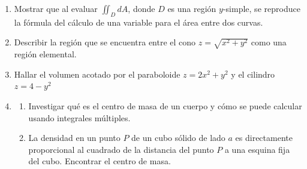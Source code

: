 \documentclass{article}
\begin{document}
\begin{enumerate}
    \item {
        Mostrar que al evaluar $\iint_DdA$, donde $D$ es una región $y$-simple, se reproduce la fórmula del cálculo de una variable para el área entre dos curvas.

        
    }

   \item {
   Describir la región que se encuentra entre el cono $z = \sqrt{x^2 + y^2}$ como una región elemental.\\

	
    }
    
   \item {
   Hallar el volumen acotado por el paraboloide $z = 2x^2 + y^2$ y el cilindro $z = 4 - y^2$\\

	
    }
    
   \item {
    \begin{enumerate}
	\item
	Investigar qué es el centro de masa de un cuerpo y cómo se puede calcular usando integrales múltiples.\\	
	
	
	\item    
	La densidad en un punto $P$ de un cubo sólido de lado $a$ es directamente proporcional al cuadrado de la distancia del punto $P$ a una esquina fija del cubo. Encontrar el centro de masa.\\    
    
    \end{enumerate}
    }
    
\end{enumerate}
\end{document}
